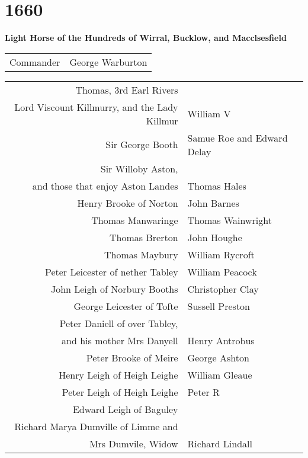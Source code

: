 \chapter*{1660}

\begin{center}
  \Large
  \textbf{Light Horse of the Hundreds of Wirral, Bucklow, and Macclsesfield}
\end{center}

\begin{center}
  \begin{tabular}{rl}
    Commander & George Warburton \\
  \end{tabular}
\end{center}

\begin{center}
  \scriptsize
  \begin{tabular}{rl}
    Thomas, 3rd Earl Rivers & \dotfill \\
    Lord Viscount Killmurry, and the Lady Killmur & William V \\
    Sir George Booth & Samue Roe and Edward Delay \\
    Sir Willoby Aston, \\ and those that enjoy Aston Landes & Thomas Hales \\
    Henry Brooke of Norton & John Barnes \\
    Thomas Manwaringe & Thomas Wainwright \\
    Thomas Brerton & John Houghe \\
    Thomas Maybury & William Rycroft \\
    Peter Leicester of nether Tabley & William Peacock \\
    John Leigh of Norbury Booths & Christopher Clay \\
    George Leicester of Tofte & Sussell Preston \\
    Peter Daniell of over Tabley, \\ and his mother Mrs Danyell & Henry Antrobus \\
    Peter Brooke of Meire & George Ashton \\
    Henry Leigh of Heigh Leighe & William Gleaue \\
    Peter Leigh of Heigh Leighe & Peter R \\
    Edward Leigh of Baguley & \dotfill \\
    Richard Marya Dumville of Limme and \\ Mrs Dumvile, Widow & Richard Lindall \\

\end{tabular}
\end{center}
